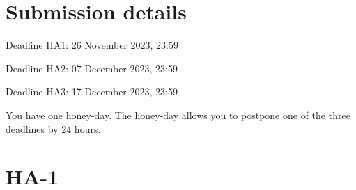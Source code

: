 \documentclass[12pt]{article}
\begin{document}
\section*{Submission details}


Deadline HA1: 26 November 2023, 23:59

Deadline HA2: 07 December 2023, 23:59

Deadline HA3: 17 December 2023, 23:59

You have one honey-day. 
The honey-day allows you to postpone one of the three deadlines by 24 hours. 

\newpage



\section{HA-1}
\end{document}
